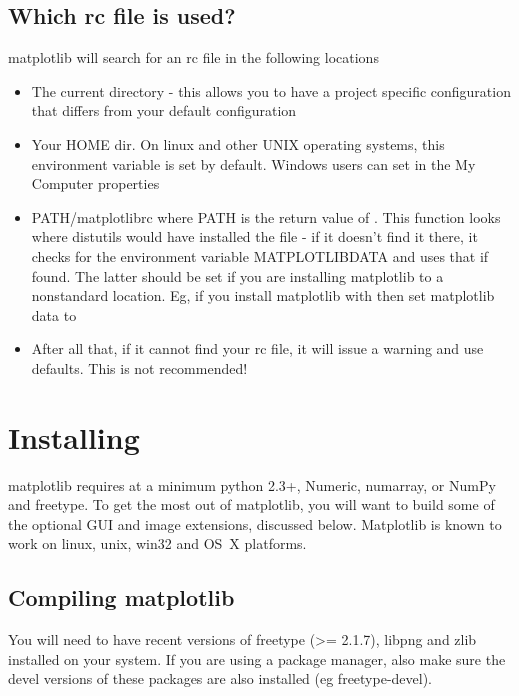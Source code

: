\documentclass[twoside]{book}
\begin{document}
\subsection{Which rc file is used?}

matplotlib will search for an rc file in the following locations

\begin{itemize}
\item The current directory - this allows you to have a project
  specific configuration that differs from your default configuration

\item Your HOME dir.  On linux and other UNIX operating systems, this
  environment variable is set by default.  Windows users can set in
  the My Computer properties
  
\item PATH/matplotlibrc where PATH is the return value of
  .  This function looks where
  distutils would have installed the file - if it doesn't find it
  there, it checks for the environment variable MATPLOTLIBDATA and
  uses that if found.  The latter should be set if you are installing
  matplotlib to a nonstandard location.  Eg, if you install matplotlib
  with  then set
  matplotlib data to 

\item After all that, if it cannot find your rc file, it will issue a
  warning and use defaults.  This is not recommended!
\end{itemize}


\section{Installing}
\label{sec:installing}

matplotlib requires at a minimum python 2.3+, Numeric, numarray, or 
NumPy and freetype.  To get the most out of matplotlib, you will want 
to build some of the optional GUI and image extensions, discussed below.
Matplotlib is known to work on linux, unix, win32 and OS~X platforms.

\subsection{Compiling matplotlib}
\label{sec:compilng}

You will need to have recent versions of freetype (>= 2.1.7), libpng
and zlib installed on your system.  If you are using a package
manager, also make sure the devel versions of these packages are also
installed (eg freetype-devel).
  
\end{document}
